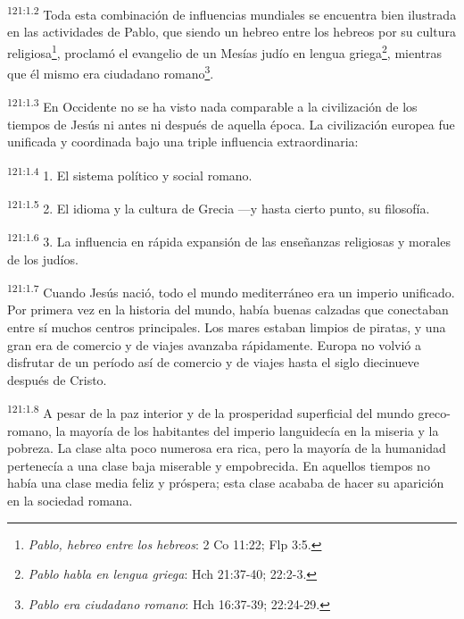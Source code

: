 \par 
\textsuperscript{121:1.2} Toda esta combinación de influencias mundiales se encuentra bien ilustrada en las actividades de Pablo, que siendo un hebreo entre los hebreos por su cultura religiosa\footnote{\textit{Pablo, hebreo entre los hebreos}: 2 Co 11:22; Flp 3:5.}, proclamó el evangelio de un Mesías judío en lengua griega\footnote{\textit{Pablo habla en lengua griega}: Hch 21:37-40; 22:2-3.}, mientras que él mismo era ciudadano romano\footnote{\textit{Pablo era ciudadano romano}: Hch 16:37-39; 22:24-29.}.

\par 
\textsuperscript{121:1.3} En Occidente no se ha visto nada comparable a la civilización de los tiempos de Jesús ni antes ni después de aquella época. La civilización europea fue unificada y coordinada bajo una triple influencia extraordinaria:

\par 
\textsuperscript{121:1.4} 1. El sistema político y social romano.

\par 
\textsuperscript{121:1.5} 2. El idioma y la cultura de Grecia ---y hasta cierto punto, su filosofía.

\par 
\textsuperscript{121:1.6} 3. La influencia en rápida expansión de las enseñanzas religiosas y morales de los judíos.

\par 
\textsuperscript{121:1.7} Cuando Jesús nació, todo el mundo mediterráneo era un imperio unificado. Por primera vez en la historia del mundo, había buenas calzadas que conectaban entre sí muchos centros principales. Los mares estaban limpios de piratas, y una gran era de comercio y de viajes avanzaba rápidamente. Europa no volvió a disfrutar de un período así de comercio y de viajes hasta el siglo diecinueve después de Cristo.

\par 
\textsuperscript{121:1.8} A pesar de la paz interior y de la prosperidad superficial del mundo greco-romano, la mayoría de los habitantes del imperio languidecía en la miseria y la pobreza. La clase alta poco numerosa era rica, pero la mayoría de la humanidad pertenecía a una clase baja miserable y empobrecida. En aquellos tiempos no había una clase media feliz y próspera; esta clase acababa de hacer su aparición en la sociedad romana.

